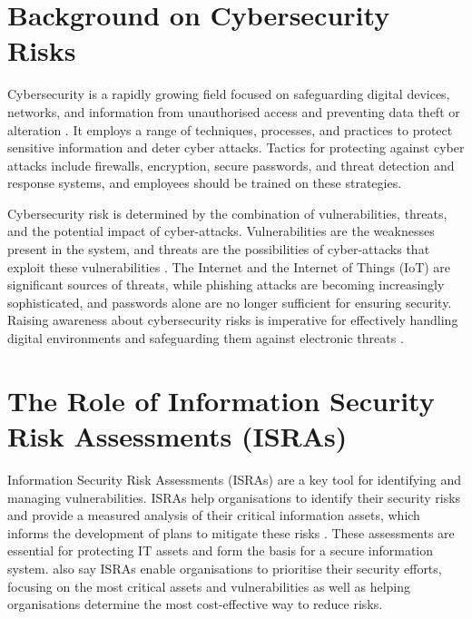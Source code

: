 \section{Background on Cybersecurity Risks}
Cybersecurity is a rapidly growing field focused on safeguarding digital devices, networks, and information from unauthorised access and preventing data theft or alteration \citep{mijwil2023exploring}. It employs a range of techniques, processes, and practices to protect sensitive information and deter cyber attacks. Tactics for protecting against cyber attacks include firewalls, encryption, secure passwords, and threat detection and response systems, and employees should be trained on these strategies.

Cybersecurity risk is determined by the combination of vulnerabilities, threats, and the potential impact of cyber-attacks. Vulnerabilities are the weaknesses present in the system, and threats are the possibilities of cyber-attacks that exploit these vulnerabilities \citep{prasad2020cyber}. The Internet and the Internet of Things (IoT) are significant sources of threats, while phishing attacks are becoming increasingly sophisticated, and passwords alone are no longer sufficient for ensuring security. Raising awareness about cybersecurity risks is imperative for effectively handling digital environments and safeguarding them against electronic threats \citep{mijwil2023exploring}.

\section{The Role of Information Security Risk Assessments (ISRAs)}
Information Security Risk Assessments (ISRAs) are a key tool for identifying and managing vulnerabilities. ISRAs help organisations to identify their security risks and provide a measured analysis of their critical information assets, which informs the development of plans to mitigate these risks \citep{shedden2010information}. These assessments are essential for protecting IT assets and form the basis for a secure information system. \citet{shedden2010information} also say ISRAs enable organisations to prioritise their security efforts, focusing on the most critical assets and vulnerabilities as well as helping organisations determine the most cost-effective way to reduce risks.

